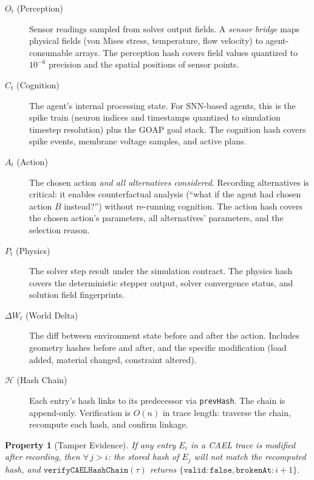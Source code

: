 \documentclass[sigconf,nonacm]{acmart}
\newtheorem{property}{Property}
\newcommand{\caelstate}[1]{E_{#1}}
\newcommand{\percept}[1]{O_{#1}}
\newcommand{\cognit}[1]{C_{#1}}
\newcommand{\action}[1]{A_{#1}}
\newcommand{\physics}[1]{P_{#1}}
\newcommand{\worldd}[1]{\Delta W_{#1}}
\newcommand{\hashfn}{\mathcal{H}}
\begin{document}
\begin{description}
  \item[$\percept{t}$ (Perception)] Sensor readings sampled from
    solver output fields. A \emph{sensor bridge} maps physical fields
    (von Mises stress, temperature, flow velocity) to agent-consumable
    arrays. The perception hash covers field values quantized to
    $10^{-6}$ precision and the spatial positions of sensor points.

  \item[$\cognit{t}$ (Cognition)] The agent's internal processing
    state. For SNN-based agents, this is the spike train
    (neuron indices and timestamps quantized to simulation timestep
    resolution) plus the GOAP goal stack. The cognition hash covers
    spike events, membrane voltage samples, and active plans.

  \item[$\action{t}$ (Action)] The chosen action \emph{and all
    alternatives considered}. Recording alternatives is critical:
    it enables counterfactual analysis (``what if the agent had chosen
    action $B$ instead?'') without re-running cognition. The action
    hash covers the chosen action's parameters, all alternatives'
    parameters, and the selection reason.

  \item[$\physics{t}$ (Physics)] The solver step result under the
    simulation contract. The physics hash covers the deterministic
    stepper output, solver convergence status, and solution field
    fingerprints.

  \item[$\worldd{t}$ (World Delta)] The diff between environment
    state before and after the action. Includes geometry hashes
    before and after, and the specific modification (load added,
    material changed, constraint altered).

  \item[$\hashfn$ (Hash Chain)] Each entry's hash links to its
    predecessor via \texttt{prevHash}. The chain is append-only.
    Verification is $O(n)$ in trace length: traverse the chain,
    recompute each hash, and confirm linkage.
\end{description}

\begin{property}[Tamper Evidence]
\label{prop:tamper}
If any entry $\caelstate{i}$ in a CAEL trace is modified after
recording, then $\forall\, j > i$: the stored hash of $\caelstate{j}$
will not match the recomputed hash, and
$\texttt{verifyCAELHashChain}(\tau)$ returns
$\{\texttt{valid}: \texttt{false}, \texttt{brokenAt}: i+1\}$.
\end{property}
\end{document}
